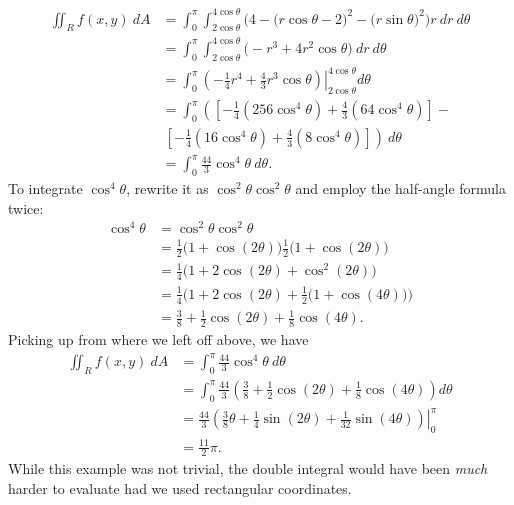 \begin{example}
\begin{align*}
\iint_Rf(x,y)\ dA
	&= \int_0^{\pi}\int_{2\cos\theta}^{4\cos\theta} \Big(4-\big(r\cos\theta-2\big)^2-\big(r\sin\theta\big)^2\Big)r\ dr\ d\theta\\
	&= \int_0^{\pi}\int_{2\cos\theta}^{4\cos\theta} \big(-r^3+4r^2\cos \theta\big)\ dr\ d\theta\\
	&= \int_0^\pi \left.\left(-\frac14r^4+\frac43r^3\cos\theta\right)\right|_{2\cos\theta}^{4\cos\theta}d\theta\\
	&=\int_0^\pi \left(\left[-\frac14(256\cos^4\theta)+\frac43(64\cos^4\theta)\right]-\right.\\
	&\ \left.\left[-\frac14(16\cos^4\theta)+\frac43(8\cos^4\theta)\right]\right)\ d\theta\\
	&=\int_0^\pi\frac{44}3\cos^4\theta\ d\theta.
\end{align*}
To integrate $\cos^4\theta$, rewrite it as $\cos^2\theta\cos^2\theta$ and employ the half-angle formula twice:
\begin{align*}
	\cos^4\theta &=\cos^2\theta\cos^2\theta\\
	&= \frac12\big(1+\cos(2\theta)\big)\frac12\big(1+\cos(2\theta)\big) \\
	&= \frac14\big(1+2\cos(2\theta)+\cos^2(2\theta)\big)\\
	&=\frac14\Big(1+2\cos(2\theta)+\frac12\big(1+\cos(4\theta)\big)\Big)\\
	&= \frac38+\frac12\cos(2\theta)+\frac18\cos(4\theta).
\end{align*}
Picking up from where we left off above, we have
\begin{align*}
\iint_Rf(x,y)\ dA &=\int_0^\pi\frac{44}3\cos^4\theta\ d\theta\\
	&=\int_0^\pi \frac{44}3\left(\frac38+\frac12\cos(2\theta)+\frac18\cos(4\theta)\right)d\theta\\
	&= \left.\frac{44}3\left(\frac{3}8\theta+\frac14\sin(2\theta)+\frac{1}{32}\sin(4\theta)\right)\right|_0^\pi\\
	&=\frac{11}2\pi%
	.
\end{align*}
While this example was not trivial, the double integral would have been \textit{much} harder to evaluate had we used rectangular coordinates.
\end{example}


